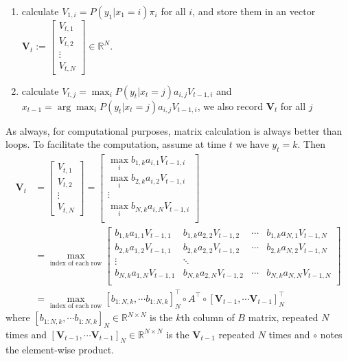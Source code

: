 \documentclass{article} [10pt] %
\begin{document}
\begin{enumerate}
	\item calculate $V_{1, i} = P(y_1|x_1=i)\pi_i$ for all $i$, and store them in an vector $\mathbf V_t:=\begin{bmatrix}V_{t,1}\\ V_{t,2}\\ \vdots\\ V_{t,N}\end{bmatrix}\in\mathbb{R}^N$.
	\item calculate $V_{t, j} = \max_{i}P(y_t|x_t=j)a_{i, j}V_{t-1, i}$ and $x_{t-1} = \arg\max_{i}P(y_t|x_t=j)a_{i, j}V_{t-1, i}$, we also record $\mathbf V_t$ for all $j$
\end{enumerate}

As always, for computational purposes, matrix calculation is always better than loops. To facilitate the computation, assume at time $t$ we have $y_t=k$. Then 
\begin{align*}
	\mathbf V_t &= \begin{bmatrix}V_{t,1}\\ V_{t,2}\\ \vdots\\ V_{t,N}\end{bmatrix}
	=\begin{bmatrix}
		\max_{i}b_{1,k}a_{i,1}V_{t-1, i}\\
		\max_{i}b_{2,k}a_{i,2}V_{t-1, i}\\
		\vdots\\
		\max_{i}b_{N,k}a_{i,N}V_{t-1, i}\\
	\end{bmatrix}\\
	&	= \max_{\text{index of each row}}\begin{bmatrix}
		b_{1,k}a_{1,1}V_{t-1, 1} & b_{1,k}a_{2,2}V_{t-1, 2} & \cdots 	&b_{1,k}a_{N,1}V_{t-1, N}\\
		b_{2,k}a_{1,2}V_{t-1, 1} & b_{2,k}a_{2,2}V_{t-1, 2} & \cdots 	&b_{2,k}a_{N,2}V_{t-1, N}\\
		\vdots & \ddots\\
		b_{N,k}a_{1,N}V_{t-1,1} & b_{N,k}a_{2,N}V_{t-1, 2} & \cdots 	&b_{N,k}a_{N,N}V_{t-1,N}\\
	\end{bmatrix}\\
	&= \max_{\text{index of each row}} [b_{1:N, k}, \cdots b_{1:N, k}]_N^\top \circ A^\top \circ [\mathbf V_{t-1}, \cdots \mathbf V_{t-1}]_N^\top
\end{align*}
where $ [b_{1:N, k}, \cdots b_{1:N, k}]_N\in \mathbb{R}^{N\times N}$ is the $k$th column of $B$ matrix, repeated $N$ times and $[\mathbf V_{t-1}, \cdots \mathbf V_{t-1}]_N\in \mathbb{R}^{N\times N}$ is the $\mathbf V_{t-1}$ repeated $N$ times and $\circ$ notes the element-wise product.
\end{document}
